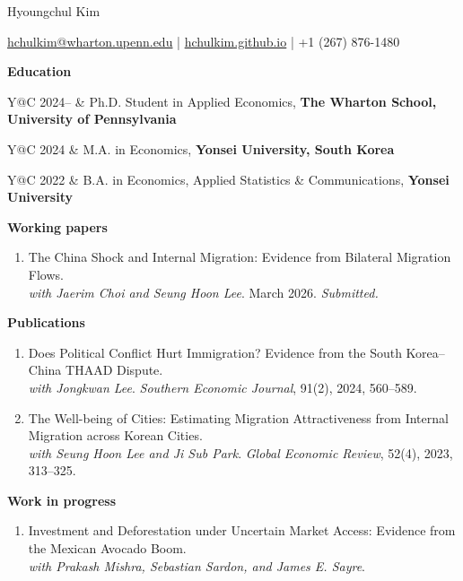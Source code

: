 \documentclass[10pt,letterpaper]{article}
\makeatletter
\newcommand{\cvsection}[1]{%
  \par\addvspace{0.78em}%
  {\bfseries #1}\par
  \vspace{0.30em}%
}
\newcommand{\cvrow}[2]{%
  \noindent\begin{tabularx}{\textwidth}{Y@{\hspace{0.12in}}C}
    #1 & #2
  \end{tabularx}\par
}
\newenvironment{cvlist}{%
  \begin{enumerate}[
    labelindent=0pt,
    labelwidth=1.25em,
    leftmargin=1.81em,
    labelsep=0.56em,
    itemsep=0.12em,
    topsep=0pt,
    parsep=0pt,
    partopsep=0pt,
    align=left
  ]
}{\end{enumerate}}
\newcommand{\papertitle}[1]{#1}
\newcommand{\withauthors}[1]{\textit{with #1}}
\newcommand{\venue}[1]{\textit{#1}}
\makeatother
\begin{document}
\begin{center}
  {\fontsize{25}{29}\selectfont Hyoungchul Kim}\par
  \vspace{0.62em}
  \href{mailto:hchulkim@wharton.upenn.edu}{hchulkim@wharton.upenn.edu}
  \;|\;
  \href{https://hchulkim.github.io}{hchulkim.github.io}
  \;|\;
  +1 (267) 876-1480
\end{center}

\vspace{0.45em}

\cvsection{Education}
\cvrow{2024--}{Ph.D. Student in Applied Economics, \textbf{The Wharton School, University of Pennsylvania}}
\cvrow{2024}{M.A. in Economics, \textbf{Yonsei University, South Korea}}
\cvrow{2022}{B.A. in Economics, Applied Statistics \& Communications, \textbf{Yonsei University}}

\cvsection{Working papers}
\begin{cvlist}
  \item \papertitle{The China Shock and Internal Migration: Evidence from Bilateral Migration Flows}.\\[-0.1em]
    \withauthors{Jaerim Choi and Seung Hoon Lee}. March 2026. \textit{Submitted.}
\end{cvlist}

\cvsection{Publications}
\begin{cvlist}
  \item \papertitle{Does Political Conflict Hurt Immigration? Evidence from the South Korea--China THAAD Dispute}.\\[-0.1em]
        \withauthors{Jongkwan Lee}. \venue{Southern Economic Journal}, 91(2), 2024, 560--589.

  \item \papertitle{The Well-being of Cities: Estimating Migration Attractiveness from Internal Migration across Korean Cities}.\\[-0.1em]
        \withauthors{Seung Hoon Lee and Ji Sub Park}. \venue{Global Economic Review}, 52(4), 2023, 313--325.
\end{cvlist}

\cvsection{Work in progress}
\begin{cvlist}
  \item \papertitle{Investment and Deforestation under Uncertain Market Access: Evidence from the Mexican Avocado Boom}.\\[-0.1em]
        \withauthors{Prakash Mishra, Sebastian Sardon, and James E. Sayre}.
\end{cvlist}
\end{document}
